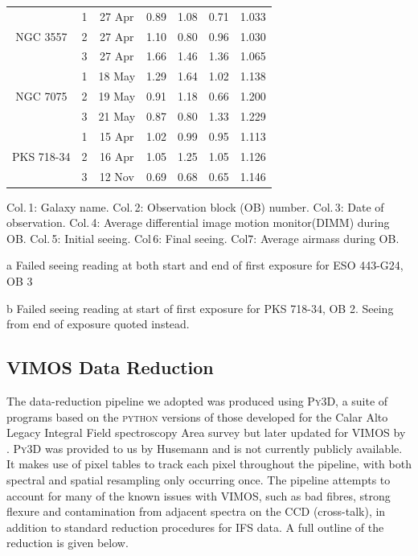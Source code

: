 \begin{table}
\begin{threeparttable}
\begin{tabular}{c c c c c c c}
			\hline
				\multirow{3}{*}{NGC 3557}& 1 & 27 Apr & 0.89 & 1.08 & 0.71 & 1.033 \\
				& 2 & 27 Apr & 1.10 & 0.80 & 0.96 & 1.030 \\
				& 3 & 27 Apr & 1.66 & 1.46 & 1.36 & 1.065 \\
			\hline
				\multirow{3}{*}{NGC 7075}& 1 & 18 May & 1.29 & 1.64 & 1.02 & 1.138 \\
				& 2 & 19 May & 0.91 & 1.18 & 0.66 & 1.200 \\
				& 3 & 21 May & 0.87 & 0.80 & 1.33 & 1.229 \\
			\hline
				\multirow{3}{*}{PKS 718-34}& 1 & 15 Apr & 1.02 & 0.99 & 0.95 & 1.113 \\
				& 2 & 16 Apr & 1.05 & 1.25\tnote{b} & 1.05 & 1.126 \\
				& 3 & 12 Nov & 0.69 & 0.68 & 0.65 & 1.146 \\
			\hline
			\hline
		\end{tabular}
			\begin{tablenotes}
			\footnotesize
			\note Col.\,1: Galaxy name. Col.\,2: Observation block (OB) number. Col.\,3: Date of observation. Col.\,4: Average differential image motion monitor(DIMM) during OB. Col.\,5: Initial seeing. Col\,6: Final seeing. Col\.7: Average airmass during OB.
			\item [a] Failed seeing reading at both start and end of first exposure for ESO 443-G24, OB 3 
			\item [b] Failed seeing reading at start of first exposure for PKS 718-34, OB 2. Seeing from end of exposure quoted instead. 
			\end{tablenotes}
		\end{threeparttable}
		\end{table}

	\subsection{VIMOS Data Reduction}
		\label{subsec:VIMOSreduction}
		The data-reduction pipeline we adopted was produced using \textsc{Py3D}, a suite of programs based on the \textsc{python} versions of those developed for the Calar Alto Legacy Integral Field spectroscopy Area survey \citep[CALIFA;][]{Sanchez2012, Husemann2013} but later updated for VIMOS by \citet{Husemann2014}. \textsc{Py3D} was provided to us by Husemann and is not currently publicly available. It makes use of pixel tables to track each pixel throughout the pipeline, with both spectral and spatial resampling only occurring once. The pipeline attempts to account for many of the known issues with VIMOS, such as bad fibres, strong flexure and contamination from adjacent spectra on the CCD (cross-talk), in addition to standard reduction procedures for IFS data. A full outline of the reduction is given below.

